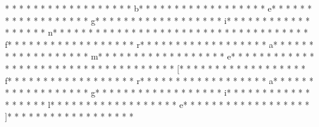 * * *  * * *  * * *  *  * * *  *  * * *  * b* * *  * * *  * * *  *  * * *  *  * * *  * e* * *  * * *  * * *  *  * * *  *  * * *  * g* * *  * * *  * * *  *  * * *  *  * * *  * i* * *  * * *  * * *  *  * * *  *  * * *  * n* * *  * * *  * * *  *  * * *  *  * * *  * {* * *  * * *  * * *  *  * * *  *  * * *  * f* * *  * * *  * * *  *  * * *  *  * * *  * r* * *  * * *  * * *  *  * * *  *  * * *  * a* * *  * * *  * * *  *  * * *  *  * * *  * m* * *  * * *  * * *  *  * * *  *  * * *  * e* * *  * * *  * * *  *  * * *  *  * * *  * }* * *  * * *  * * *  *  * * *  *  * * *  * [* * *  * * *  * * *  *  * * *  *  * * *  * f* * *  * * *  * * *  *  * * *  *  * * *  * r* * *  * * *  * * *  *  * * *  *  * * *  * a* * *  * * *  * * *  *  * * *  *  * * *  * g* * *  * * *  * * *  *  * * *  *  * * *  * i* * *  * * *  * * *  *  * * *  *  * * *  * l* * *  * * *  * * *  *  * * *  *  * * *  * e* * *  * * *  * * *  *  * * *  *  * * *  * ]* * *  * * *  * * *  *  * * *  *  * * *  * 

